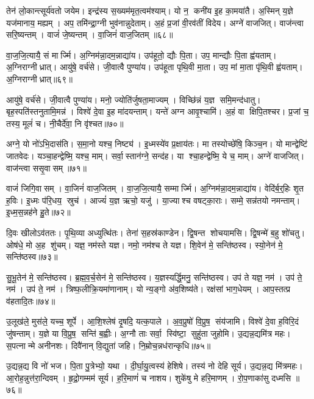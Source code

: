तेन॑ लो॒कान्त्सूर्य॑वतो जयेम।
इन्द्र॑स्य स॒ख्यम॑मृत॒त्वम॑श्याम्।
यो न॒ कनी॑य इ॒ह का॒मया॑तै।
अ॒स्मिन् य॒ज्ञे यज॑मानाय॒ मह्यम्।
अप॒ तमि॑न्द्रा॒ग्नी भुव॑नान्नुदेताम्।
अ॒हं प्र॒जां वी॒रव॑तीं विदेय।
अग्ने॑ वाजजित्।
वाज॑न्त्वा सरि॒ष्यन्तम्।
वाजं॑ जे॒ष्यन्तम्।
वा॒जिनं॑ वाज॒जितम्॥६८॥

वा॒ज॒जि॒त्यायै॒ सं मार्ज्मि।
अ॒ग्निम॑न्ना॒दम॒न्नाद्या॑य।
उप॑हूतो॒ द्यौः पि॒ता।
उप॒ मान्द्यौः पि॒ता ह्व॑यताम्।
अ॒ग्निराग्नीध्रात्।
आयु॑षे॒ वर्च॑से।
जी॒वात्वै पुण्या॑य।
उप॑हूता पृथि॒वी मा॒ता।
उप॒ मां मा॒ता पृ॑थि॒वी ह्व॑यताम्।
अ॒ग्निराग्नीध्रात्॥६९॥

आयु॑षे॒ वर्च॑से।
जी॒वात्वै पुण्या॑य।
मनो॒ ज्योति॑र्जुषता॒माज्यम्।
विच्छि॑न्नं य॒ज्ञ समि॒मन्द॑धातु।
बृह॒स्पति॑स्तनुतामि॒मन्न॑।
विश्वे॑ दे॒वा इ॒ह मा॑दयन्ताम्।
यन्ते॑ अग्न आवृ॒श्चामि॑।
अ॒हं वा क्षिपि॒तश्चर\sn{}।
प्र॒जां च॒ तस्य॒ मूलं॑ च।
नी॒चैर्दे॑वा॒ नि वृ॑श्चत॥७०॥

अग्ने॒ यो नो॑ऽभि॒दास॑ति।
स॒मा॒नो यश्च॒ निष्ट्य॑।
इ॒ध्मस्ये॑व प्र॒क्षाय॑तः।
मा तस्योच्छे॑षि॒ किञ्च॒न।
यो मान्द्वेष्टि॑ जातवेदः।
यञ्चा॒हन्द्वेष्मि॒ यश्च॒ माम्।
सर्वा॒स्तान॑ग्ने॒ सन्द॑ह।
या श्चा॒हन्द्वेष्मि॒ ये च॒ माम्।
अग्ने॑ वाजजित्।
वाज॑न्त्वा ससृ॒वासम्॥७१॥

वाजं॑ जिगि॒वासम्।
वा॒जिनं॑ वाज॒जितम्।
वा॒ज॒जि॒त्यायै॒ सम्मार्ज्मि।
अ॒ग्निम॑न्ना॒दम॒न्नाद्या॑य।
वेदि॑र्ब॒र्॒हिः शृ॒त ह॒विः।
इ॒ध्मः प॑रि॒धय॒ स्रुच॑।
आज्यं॑ य॒ज्ञ ऋचो॒ यजु॑।
या॒ज्याश्च वषट्का॒राः।
सम्मे॒ सन्न॑तयो नमन्ताम्।
इ॒ध्म॒स॒न्नह॑ने हु॒ते॥७२॥

दि॒वः खीलोऽव॑ततः।
पृ॒थि॒व्या अध्युत्थि॑तः।
तेना॑ स॒हस्र॑काण्डेन।
द्वि॒षन्त शोचयामसि।
द्वि॒षन्मे॑ ब॒हु शो॑चतु।
ओष॑धे॒ मो अ॒ह शु॑चम्।
यज्ञ॒ नम॑स्ते यज्ञ।
नमो॒ नम॑श्च ते यज्ञ।
शि॒वेन॑ मे॒ सन्ति॑ष्ठस्व।
स्यो॒नेन॑ मे॒ सन्ति॑ष्ठस्व॥७३॥

सु॒भू॒तेन॑ मे॒ सन्ति॑ष्ठस्व।
ब्र॒ह्म॒व॒र्च॒सेन॑ मे॒ सन्ति॑ष्ठस्व।
य॒ज्ञस्यर्द्धि॒मनु॒ सन्ति॑ष्ठस्व।
उप॑ ते यज्ञ॒ नम॑।
उप॑ ते॒ नम॑।
उप॑ ते॒ नम॑।
त्रिष्फ॒लीक्रि॒यमा॑णानाम्।
यो न्य॒ङ्गो अ॑व॒शिष्य॑ते।
रक्ष॑सां भाग॒धेयम्।
आप॒स्तत्प्र व॑हतादि॒तः॥७४॥

उ॒लूख॑ले॒ मुस॑ले॒ यच्च॒ शूर्पे।
आ॒शि॒श्लेष॑ दृ॒षदि॒ यत्क॒पाले।
अ॒व॒प्रुषो॑ वि॒प्रुष॒ संय॑जामि।
विश्वे॑ दे॒वा ह॒विरि॒दं जु॑षन्ताम्।
य॒ज्ञे या वि॒प्रुष॒ सन्ति॑ ब॒ह्वीः।
अ॒ग्नौ ताः सर्वा॒ स्वि॑ष्टा॒ सुहु॑ता जुहोमि।
उ॒द्यन्न॒द्यमि॑त्र महः।
स॒पत्नान्मे अनीनशः।
दिवै॑नान् वि॒द्युता॑ जहि।
नि॒म्रोच॒न्नध॑रान्कृधि॥७५॥

उ॒द्यन्न॒द्य वि नो॑ भज।
पि॒ता पु॒त्रेभ्यो॒ यथा।
दी॒र्घा॒यु॒त्वस्य॑ हेशिषे।
तस्य॑ नो देहि सूर्य।
उ॒द्यन्न॒द्य मि॑त्रमहः।
आ॒रोह॒न्नुत्त॑रा॒न्दिवम्।
हृ॒द्रो॒गम्मम॑ सूर्य।
ह॒रि॒माणं॑ च नाशय।
शुके॑षु मे हरि॒माणम्।
रो॒प॒णाका॑सु दध्मसि ॥७६॥

